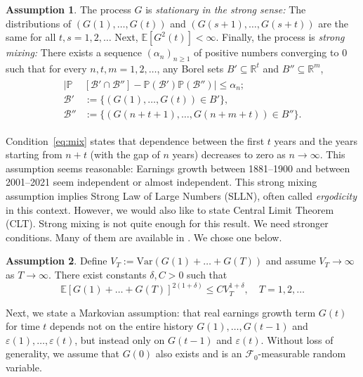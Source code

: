 \documentclass[12pt]{amsart}
\theoremstyle{definition}
\newtheorem{asmp}{Assumption}
\begin{document}
\begin{asmp} The process $G$ is {\it stationary in the strong sense:} The distributions of $(G(1), \ldots, G(t))$ and $(G(s+1), \ldots, G(s + t))$ are the same for all $t, s = 1, 2, \ldots$ Next, $\mathbb E[G^2(t)] < \infty$. Finally, the process is {\it strong mixing:} There exists a sequence $(\alpha_n)_{n \ge 1}$ of positive numbers converging to $0$ such that for every $n, t, m = 1, 2, \ldots$, any Borel sets $B' \subseteq \mathbb R^{t}$ and $B'' \subseteq \mathbb R^m$, 
\begin{align}
\label{eq:mix}
\begin{split}
|\mathbb P&\left[\mathcal B' \cap \mathcal B''\right]  - \mathbb P(\mathcal B')\mathbb P(\mathcal B'')| \le \alpha_n;\\
\mathcal B' &:= \{(G(1), \ldots, G(t)) \in B'\},\\  \mathcal B'' & := \{(G(n+t+1), \ldots, G(n+m+t)) \in B''\}.
\end{split}
\end{align}
\label{asmp:strong-mixing}
\end{asmp}

Condition~\eqref{eq:mix} states that dependence between the first $t$ years and the years starting from $n+t$ (with the gap of $n$ years) decreases to zero as $n \to \infty$. This assumption seems reasonable: Earnings growth between 1881--1900 and 
between 2001--2021 seem independent or almost independent. This strong mixing assumption implies Strong Law of Large Numbers (SLLN), often called {\it ergodicity} in this context. However, we would also like to state Central Limit Theorem (CLT). Strong mixing is not quite enough for this result. We need stronger conditions. Many of them are available in \cite{ETBook}. We chose one below. 

\begin{asmp} Define $V_T := \mathrm{Var}(G(1) + \ldots + G(T))$ and assume $V_T \to \infty$ as $T \to \infty$. There exist constants $\delta, C > 0$ such that 
$$
\mathbb E\left[G(1) + \ldots + G(T)\right]^{2(1+\delta)} \le CV^{1 + \delta}_T,\quad T = 1, 2, \ldots
$$
\label{asmp:CLT}
\end{asmp}

Next, we state a Markovian assumption: that real earnings growth term $G(t)$ for time $t$ depends not on the entire history $G(1), \ldots, G(t-1)$ and $\varepsilon(1), \ldots, \varepsilon(t)$, but instead only on $G(t-1)$ and $\varepsilon(t)$. Without loss of generality, we assume that $G(0)$ also exists and is an $\mathcal F_0$-measurable random variable. 
\end{document}
